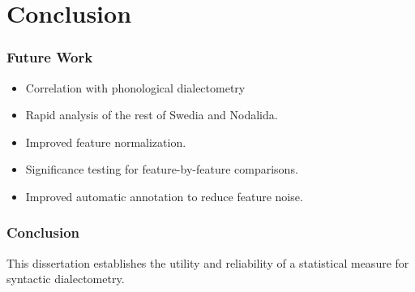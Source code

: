 \documentclass{beamer}
\begin{document}
\section{Conclusion}
\begin{frame}
  \frametitle{Future Work}
  \begin{itemize}
  \item Correlation with phonological dialectometry
 \item Rapid analysis of the rest of Swedia and Nodalida.
 \item Improved feature normalization.
  \item Significance testing for feature-by-feature comparisons.
 \item Improved automatic annotation to reduce feature noise.
  \end{itemize}
\end{frame}
\begin{frame}
  \frametitle{Conclusion}
  This dissertation establishes the utility and reliability of a
  statistical measure for syntactic dialectometry.
\end{frame}
\end{document}
